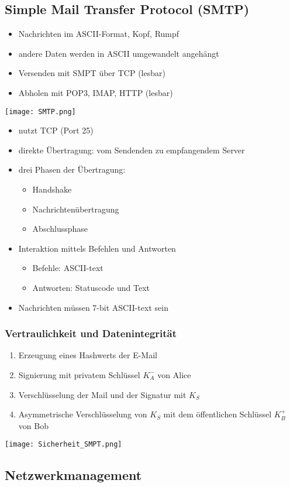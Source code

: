 	\subsection{Simple Mail Transfer Protocol (SMTP)}
		\begin{itemize}
			\item Nachrichten im ASCII-Format, Kopf, Rumpf
			\item andere Daten werden in ASCII umgewandelt angehängt
			\item Versenden mit SMPT über TCP (lesbar)
			\item Abholen mit POP3, IMAP, HTTP (lesbar)
		\end{itemize}
		\begin{center}
			\texttt{[image: SMTP.png]}
		\end{center}
		\begin{itemize}
			\item nutzt TCP (Port 25)
			\item direkte Übertragung: vom Sendenden zu empfangendem Server
			\item drei Phasen der Übertragung:
				\begin{itemize}
					\item Handshake
					\item Nachrichtenübertragung
					\item Abschlussphase
				\end{itemize}
			\item Interaktion mittels Befehlen und Antworten
				\begin{itemize}
					\item Befehle: ASCII-text
					\item Antworten: Statuscode und Text
				\end{itemize}
			\item Nachrichten müssen 7-bit ASCII-text sein
		\end{itemize}
		\subsubsection{Vertraulichkeit und Datenintegrität}
			\begin{enumerate}
				\item Erzeugung eines Hashwerts der E-Mail
				\item Signierung mit privatem Schlüssel $K_A^-$ von Alice
				\item Verschlüsselung der Mail und der Signatur mit $K_S$
				\item Asymmetrische Verschlüsselung von $K_S$ mit dem öffentlichen Schlüssel $K_B^+$ von Bob
			\end{enumerate}
			\begin{center}
				\texttt{[image: Sicherheit\_SMPT.png]}
			\end{center}

	
	\subsection{Netzwerkmanagement}
							
			
			
			
			
